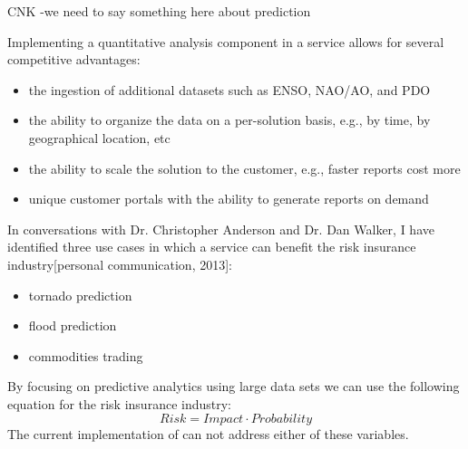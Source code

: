 CNK -we need to say something here about prediction


Implementing a quantitative analysis component in a \ce service allows for several competitive advantages:
\begin{itemize}
    \item{the ingestion of additional datasets such as \textsc{ENSO}, \textsc{NAO/AO}, and \textsc{PDO}\cite[p. 1]{methods}}
    \item{the ability to organize the data on a per-solution basis, e.g., by time, by geographical location, etc}
    \item{the ability to scale the solution to the customer, e.g., faster reports cost more}
    \item{unique customer portals with the ability to generate reports on demand}
\end{itemize}
In conversations with Dr. Christopher Anderson and Dr. Dan Walker, I have identified three use cases in which a \ce service can benefit the risk insurance industry[personal communication, 2013]:
\begin{itemize}
    \item tornado prediction
    \item flood prediction
    \item commodities trading
\end{itemize}
By focusing on predictive analytics using large data sets we can use the following equation for the risk insurance industry:
\begin{equation*}
    Risk = Impact \cdot Probability
\end{equation*}
The current implementation of \climatedge can not address either of these variables.

\renewcommand\bibname{{References}}



